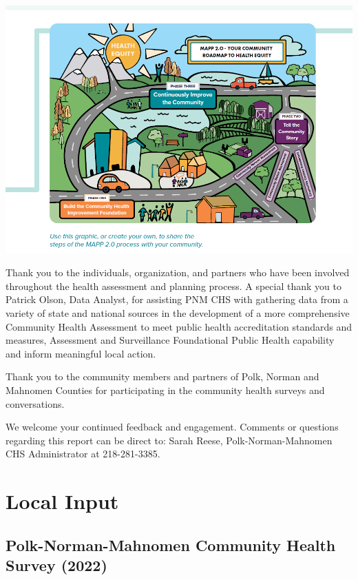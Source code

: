 \documentclass[
  a4paper,
  landscape]{scrreprt}
\begin{document}
\includegraphics{pages/Attachments/Introduction/MAPP.png}

Thank you to the individuals, organization, and partners who have been
involved throughout the health assessment and planning process. A
special thank you to Patrick Olson, Data Analyst, for assisting PNM CHS
with gathering data from a variety of state and national sources in the
development of a more comprehensive Community Health Assessment to meet
public health accreditation standards and measures, Assessment and
Surveillance Foundational Public Health capability and inform meaningful
local action.

Thank you to the community members and partners of Polk, Norman and
Mahnomen Counties for participating in the community health surveys and
conversations.

We welcome your continued feedback and engagement. Comments or questions
regarding this report can be direct to: Sarah Reese,
Polk-Norman-Mahnomen CHS Administrator at 218-281-3385.


\chapter{\texorpdfstring{\vspace{-2cm} Local
Input}{ Local Input}}\label{local-input}

\section{Polk-Norman-Mahnomen Community Health Survey
(2022)}\label{polk-norman-mahnomen-community-health-survey-2022}
\end{document}
